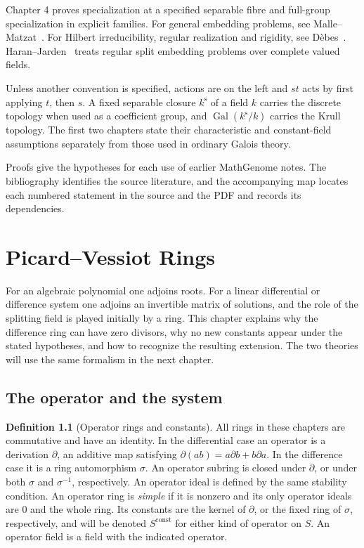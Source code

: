 \documentclass[11pt,oneside,openany]{book}
\theoremstyle{definition}
\newtheorem{definition}[theorem]{Definition}
\theoremstyle{remark}
\begin{document}
Chapter 4 proves specialization at a specified separable fibre and
full-group specialization in explicit families. For general
embedding problems, see Malle--Matzat~\cite[Chapter IV, Sections 1--2]{mallematzat}.
For Hilbert irreducibility, regular realization and rigidity, see
D\`ebes~\cite[Sections 5.2--5.3 and 8.2]{debes}.
Haran--Jarden~\cite[Sections 1 and 5]{haranjarden} treats regular split
embedding problems over complete valued fields.

Unless another convention is specified, actions are on the left and
\(st\) acts by first applying \(t\), then \(s\). A fixed separable
closure \(k^{\mathrm s}\) of a field \(k\) carries the discrete topology
when used as a coefficient group, and
\(\operatorname{Gal}(k^{\mathrm s}/k)\) carries the Krull topology.
The first two chapters state their characteristic and constant-field
assumptions separately from those used in ordinary Galois theory.

Proofs give the hypotheses for each use of earlier MathGenome notes.
The bibliography identifies the source literature, and the accompanying
map locates each numbered statement in the source and the PDF and records
its dependencies.

\mainmatter
\chapter{Picard--Vessiot Rings}

For an algebraic polynomial one adjoins roots. For a linear differential
or difference system one adjoins an invertible matrix of solutions,
and the role of the splitting field is played initially by a ring.
This chapter explains why the difference ring can have zero divisors,
why no new constants appear under the stated hypotheses, and how to
recognize the resulting extension. The two theories will use the same
formalism in the next chapter.

\section{The operator and the system}

\begin{definition}[Operator rings and constants]
\label{res:PV01}
All rings in these chapters are commutative and have an identity. In
the differential case an operator is a derivation \(\partial\), an
additive map satisfying \(\partial(ab)=a\partial b+b\partial a\).
In the difference case it is a ring automorphism \(\sigma\).
An operator subring is closed under \(\partial\), or under both
\(\sigma\) and \(\sigma^{-1}\), respectively. An operator ideal is
defined by the same stability condition. An operator ring is
\emph{simple} if it is nonzero and its only operator ideals are \(0\)
and the whole ring. Its constants are the kernel of \(\partial\), or
the fixed ring of \(\sigma\), respectively, and will be denoted
\(S^{\mathrm{const}}\) for either kind of operator on \(S\).
An operator field is a field with the indicated operator.
\end{definition}
\end{document}
